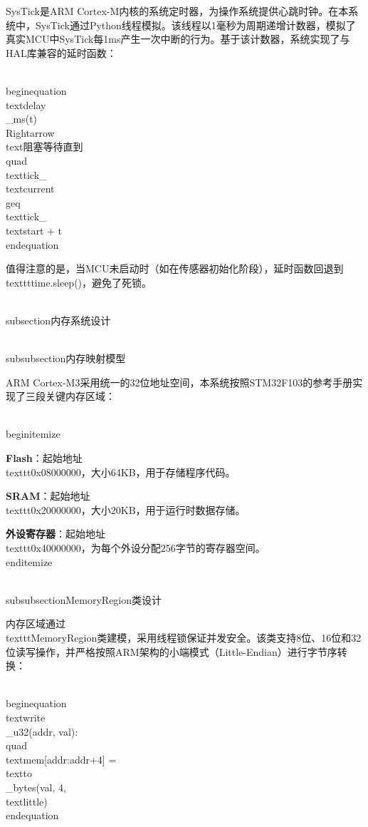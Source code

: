 \documentclass[12pt,a4paper]{ctexart}
\begin{document}
SysTick是ARM Cortex-M内核的系统定时器，为操作系统提供心跳时钟。在本系统中，SysTick通过Python线程模拟。该线程以1毫秒为周期递增计数器，模拟了真实MCU中SysTick每1ms产生一次中断的行为。基于该计数器，系统实现了与HAL库兼容的延时函数：

\\begin{equation}
\\text{delay\\_ms}(t) \\Rightarrow \\text{阻塞等待直到} \\quad \\text{tick}_{\\text{current}} \\geq \\text{tick}_{\\text{start}} + t
\\end{equation}

值得注意的是，当MCU未启动时（如在传感器初始化阶段），延时函数回退到\\texttt{time.sleep()}，避免了死锁。

\\subsection{内存系统设计}

\\subsubsection{内存映射模型}

ARM Cortex-M3采用统一的32位地址空间，本系统按照STM32F103的参考手册实现了三段关键内存区域：

\\begin{itemize}
    \item \textbf{Flash}：起始地址\\texttt{0x08000000}，大小64KB，用于存储程序代码。
    \item \textbf{SRAM}：起始地址\\texttt{0x20000000}，大小20KB，用于运行时数据存储。
    \item \textbf{外设寄存器}：起始地址\\texttt{0x40000000}，为每个外设分配256字节的寄存器空间。
\\end{itemize}

\\subsubsection{MemoryRegion类设计}

内存区域通过\\texttt{MemoryRegion}类建模，采用线程锁保证并发安全。该类支持8位、16位和32位读写操作，并严格按照ARM架构的小端模式（Little-Endian）进行字节序转换：

\\begin{equation}
\\text{write\\_u32}(addr, val): \\quad \\text{mem}[addr:addr+4] = \\text{to\\_bytes}(val, 4, \\text{little})
\\end{equation}
\end{document}
